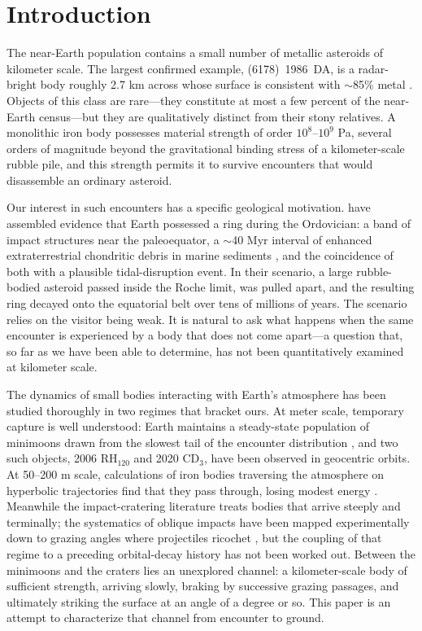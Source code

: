 \documentclass[twocolumn]{aastex701}
\begin{document}

\section{Introduction} \label{sec:intro}

The near-Earth population contains a small number of metallic asteroids of
kilometer scale. The largest confirmed example, (6178)~1986~DA, is a
radar-bright body roughly 2.7 km across whose surface is consistent with
$\sim$85\% metal \citep{sanchez2021}. Objects of this class are rare---they
constitute at most a few percent of the near-Earth census---but they are
qualitatively distinct from their stony relatives. A monolithic iron body
possesses material strength of order $10^{8}$--$10^{9}$ Pa, several orders
of magnitude beyond the gravitational binding stress of a kilometer-scale
rubble pile, and this strength permits it to survive encounters that would
disassemble an ordinary asteroid.

Our interest in such encounters has a specific geological motivation.
\citet{tomkins2024} have assembled evidence that Earth possessed a ring
during the Ordovician: a band of impact structures near the paleoequator, a
$\sim$40 Myr interval of enhanced extraterrestrial chondritic debris in
marine sediments \citep{schmitz2001}, and the coincidence of both with a
plausible tidal-disruption event. In their scenario, a large rubble-bodied
asteroid passed inside the Roche limit, was pulled apart, and the resulting
ring decayed onto the equatorial belt over tens of millions of years. The
scenario relies on the visitor being weak. It is natural to ask what
happens when the same encounter is experienced by a body that does not
come apart---a question that, so far as we have been able to determine,
has not been quantitatively examined at kilometer scale.

The dynamics of small bodies interacting with Earth's atmosphere has been
studied thoroughly in two regimes that bracket ours. At meter scale,
temporary capture is well understood: Earth maintains a steady-state
population of minimoons drawn from the slowest tail of the encounter
distribution \citep{granvik2012, fedorets2017}, and two such objects, 2006
RH$_{120}$ and 2020 CD$_{3}$, have been observed in geocentric orbits. At
50--200 m scale, calculations of iron bodies traversing the atmosphere on
hyperbolic trajectories find that they pass through, losing modest energy
\citep{khrennikov2020}. Meanwhile the impact-cratering literature treats
bodies that arrive steeply and terminally; the systematics of oblique
impacts have been mapped experimentally down to grazing angles where
projectiles ricochet \citep{gaultwedekind1978, schultzgault1990}, but the
coupling of that regime to a preceding orbital-decay history has not been
worked out. Between the minimoons and the craters lies an unexplored
channel: a kilometer-scale body of sufficient strength, arriving slowly,
braking by successive grazing passages, and ultimately striking the surface
at an angle of a degree or so. This paper is an attempt to characterize
that channel from encounter to ground.
\end{document}
